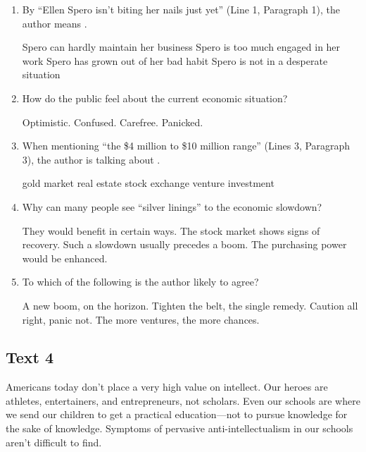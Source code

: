 \begin{enumerate}[resume]
	\item
By ``Ellen Spero isn't biting her nails just yet'' (Line 1,
Paragraph 1), the author means \lineread.


\fourchoices
{Spero can hardly maintain her business}
{Spero is too much engaged in her work}
{Spero has grown out of her bad habit}
{Spero is not in a desperate situation}


\item
How do the public feel about the current economic situation?


\fourchoices
{Optimistic.}
{Confused.}
{Carefree.}
{Panicked.}


\item
 When mentioning ``the \$4 million to \$10 million range'' (Lines 3,
Paragraph 3), the author is talking about \lineread.

\fourchoices
{gold market}
{real estate}
{stock exchange}
{venture investment}


\item
Why can many people see ``silver linings'' to the economic slowdown?


\fourchoices
{They would benefit in certain ways.}
{The stock market shows signs of recovery.}
{Such a slowdown usually precedes a boom.}
{The purchasing power would be enhanced.}


\item
To which of the following is the author likely to agree?


\fourchoices
{A new boom, on the horizon.}
{Tighten the belt, the single remedy.}
{Caution all right, panic not.}
{The more ventures, the more chances.}



\end{enumerate}


\newpage
\subsection{Text 4}


Americans today don't place a very high value on intellect. Our heroes
are athletes, entertainers, and entrepreneurs, not scholars. Even our
schools are where we send our children to get a practical
education---not to pursue knowledge for the sake of knowledge. Symptoms
of pervasive anti-intellectualism in our schools aren't difficult to
find.

